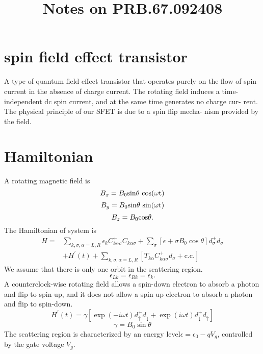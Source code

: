 \documentclass[11pt,a4paper]{article}
\begin{document}
\title{Notes on PRB.67.092408}
\date{}
\maketitle

\section{spin field effect transistor}
A type of quantum field effect transistor that operates purely on the flow of spin current in the absence of charge current. The rotating field induces a time-independent dc spin current, and at the same time generates no charge cur- rent. The physical principle of our SFET is due to a spin flip mecha- nism provided by the field.
\section{Hamiltonian}
A rotating magnetic field is
\begin{equation}
B_{x} = B_{0}\rm{sin}\theta ~\rm{cos}(\omega t)
\end{equation}
\begin{equation}
B_{y} = B_{0}\rm{sin}\theta~\rm{sin}(\omega t)
\end{equation}
\begin{equation}
B_{z} = B_{0}\rm{cos}\theta.
\end{equation}
The Hamiltonian of system is
\begin{equation}
\begin{split}
H=&\sum_{k, \sigma, \alpha=L, R} \epsilon_{k} C_{k \alpha \sigma}^{+} C_{k \alpha \sigma}+\sum_{\sigma}\left[\epsilon+\sigma B_{0} \cos \theta\right] d_{\sigma}^{+} d_{\sigma}\\
&+H^{\prime}(t)+\sum_{k, \sigma, \alpha=L, R}\left[T_{k \alpha} C_{k \alpha \sigma}^{+} d_{\sigma}+\mathrm{c.c.}\right]
\end{split}
\end{equation}
We assume that there is only one orbit in the scattering region.
\[
\epsilon_{Lk} = \epsilon_{Rk} = \epsilon_{k}.
\]
A counterclock-wise rotating field allows a spin-down electron to absorb a photon and flip to spin-up, and it does not allow a spin-up electron to absorb a photon and flip to spin-down.
\begin{equation}
H^{\prime}(t)=\gamma\left[\exp (-i \omega t) d_{\uparrow}^{+} d_{\downarrow}+\exp (i \omega t) d_{\downarrow}^{+} d_{\uparrow}\right]
\end{equation}
\begin{equation}
\gamma=B_{0} \sin \theta
\end{equation}
The scattering region is characterized by an energy level$\epsilon = \epsilon_{0} - qV_{g}$, controlled by the gate voltage $V_{g}$.
\end{document}
